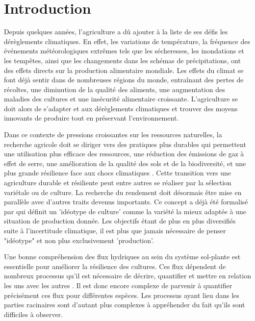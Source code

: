 \section*{Introduction}

Depuis quelques années, l’agriculture a dû ajouter à la liste de ses défis les dérèglements climatiques.
En effet, les variations de température, la fréquence des événements météorologiques extrêmes tels que les sécheresses, les inondations et les tempêtes, ainsi que les changements dans les schémas de précipitations, ont des effets directs sur la production alimentaire mondiale.
Les effets du climat se font déjà sentir dans de nombreuses régions du monde, entraînant des pertes de récoltes, une diminution de la qualité des aliments, une augmentation des maladies des cultures et une insécurité alimentaire croissante.
L’agriculture se doit alors de s’adapter et aux dérèglements climatiques et trouver des moyens innovants de produire tout en préservant l’environnement. 
\newline

Dans ce contexte de pressions croissantes sur les ressources naturelles, la recherche agricole doit se diriger vers des pratiques plus durables qui permettent une utilisation plus efficace des ressources, une réduction des émissions de gaz à effet de serre, une amélioration de la qualité des sols et de la biodiversité, et une plus grande résilience face aux chocs climatiques \citep{oecd_building_2021}.
Cette transition vers une agriculture durable et résiliente peut entre autres se réaliser par la sélection variétale ou de culture.
La recherche du rendement doit désormais être mise en parallèle avec d'autres traits devenus importants.
Ce concept a déjà été formalisé par \cite{donald_breeding_1968} qui définit un 'idéotype de culture' comme la variété la mieux adaptée à une situation de production donnée.
Les objectifs étant de plus en plus diversifiés suite à l'incertitude climatique, il est plus que jamais nécessaire de penser "idéotype" et non plus exclusivement 'production'.
\newline

Une bonne compréhension des flux hydriques au sein du système sol-plante est essentielle pour améliorer la résilience des cultures. Ces flux dépendent de nombreux processus qu'il est nécessaire de décrire, quantifier et mettre en relation les uns avec les autres \citep{lobet_plant_2014}. 
Il est donc encore complexe de parvenir à quantifier précisément ces flux pour différentes espèces. Les processus ayant lieu dans les parties racinaires sont d'autant plus complexes à appréhender du fait qu'ils sont difficiles à observer. 
\newline
 
